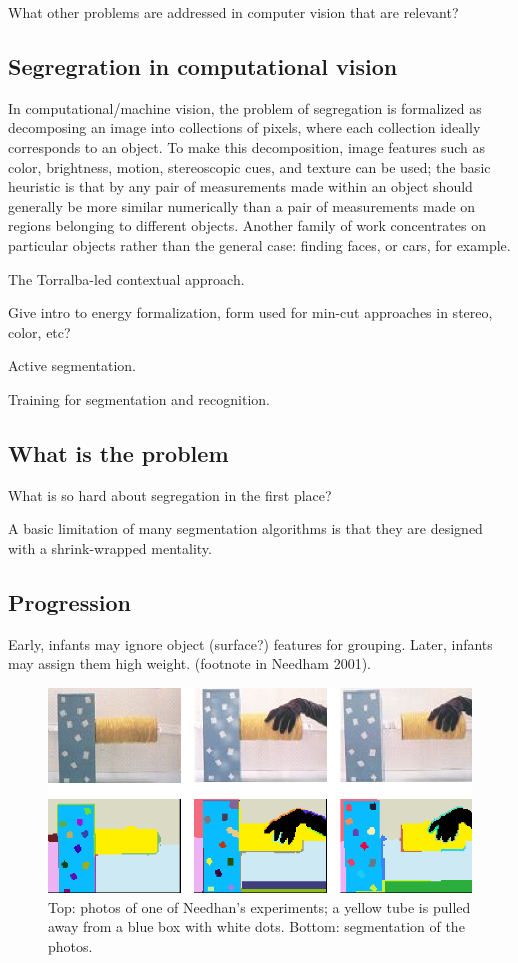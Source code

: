 What other problems are addressed in computer vision that
are relevant?


\subsection{Segregration in computational vision}

In computational/machine vision, the problem of segregation is
formalized as decomposing an image into collections of pixels, where
each collection ideally corresponds to an object.  To make this
decomposition, image features such as color, brightness, motion,
stereoscopic cues, and texture can be used; the basic heuristic
is that by any pair of measurements made within an object should
generally be more similar numerically than a pair of measurements
made on regions belonging to different objects.  Another family
of work concentrates on particular objects rather than the general
case: finding faces, or cars, for example.

The Torralba-led contextual approach.

Give intro to energy formalization, form used
for min-cut approaches in stereo, color, etc?

Active segmentation.

Training for segmentation and recognition.

\subsection{What is the problem}

What is so hard about segregation in the first place?

A basic limitation of many segmentation algorithms is
that they are designed with a shrink-wrapped mentality.


\subsection{Progression}

Early, infants may ignore object (surface?) features for grouping.
Later, infants may assign them high weight. (footnote in
Needham 2001).


\begin{figure}

\centerline{\includegraphics[width=0.5\columnwidth]{fig-pull}}

\caption{
Top: photos of one of Needhan's experiments; a yellow tube is 
pulled away from a blue box with white dots.
Bottom: segmentation of the photos.
}

\end{figure}


